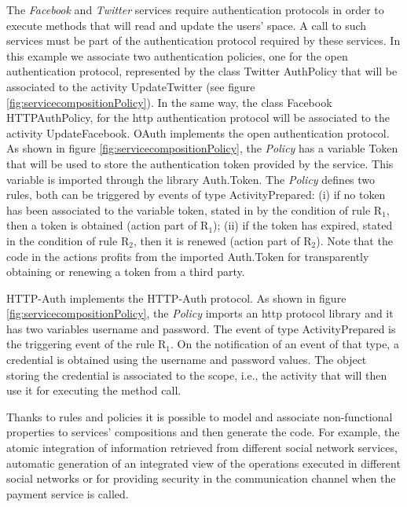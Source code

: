 The {\em Facebook} and {\em Twitter} services require authentication
protocols in order to execute methods that will read and update the users'
space. A call to such services must be part of the authentication protocol
required by these services. In this example we  associate two authentication
policies, one for the open authentication protocol, represented by the class
{\sf\small Twitter AuthPolicy} that will be associated to the activity
{\sf\small UpdateTwitter} (see figure \ref{fig:servicecompositionPolicy}). In
the same way, the  class {\sf\small Facebook HTTPAuthPolicy}, for the http
authentication protocol will be associated to the activity {\sf\small
UpdateFacebook}. {\sf\small OAuth}  implements the open authentication protocol.
As shown in figure \ref{fig:servicecompositionPolicy}, the {\em Policy} has a
variable {\sf\small Token} that will be used to store the authentication token
provided by the service. This variable is imported through the library
{\sf\small Auth.Token}. The {\em Policy}  defines two rules, both can be
triggered by events of type {\sf\small ActivityPrepared}: (i) if no token has
been associated to the variable {\sf\small token}, stated in by the condition of
rule {\sf\small R$_1$}, then a token is obtained (action part of {\sf\small
R$_1$}); (ii) if the token has expired, stated in the condition of rule
{\sf\small R$_2$}, then it is renewed (action part of {\sf\small R$_2$}). Note
that the code in the actions profits from the imported  {\sf\small Auth.Token}
for transparently obtaining or renewing a token from a third party.
 
HTTP-Auth implements the HTTP-Auth protocol.  As shown in figure
\ref{fig:servicecompositionPolicy}, the {\em Policy} imports an http protocol
library and it has two variables {\sf\small username} and {\sf\small password}.
The event of type {\sf\small ActivityPrepared} is the triggering event of the
rule {\sf\small R$_1$}. On the notification of an event of that type, a
credential is obtained using the username and password values. The object
storing the credential is associated to the scope, i.e., the activity that will
then use it for executing the method call.

\bigskip
\bigskip

Thanks to rules and policies it is possible to model and associate
non-functional properties to services' compositions  and then generate the code.
For example, the atomic integration of information retrieved from different
social network services, automatic generation of an integrated view of the
operations executed in different social networks or for providing security in
the communication channel when the payment service is called.

